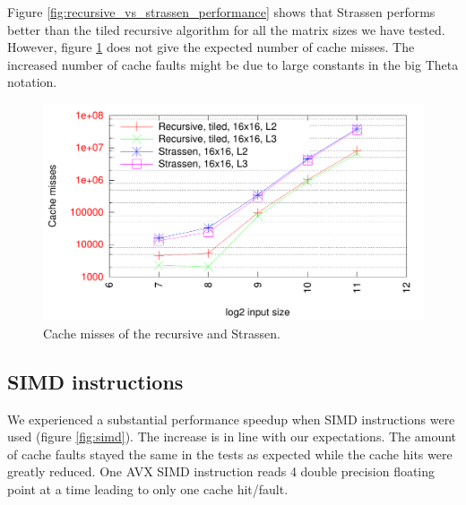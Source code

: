 Figure \ref{fig:recursive_vs_strassen_performance} shows that Strassen performs better than the tiled recursive algorithm for all the matrix sizes we have tested. However, figure \ref{fig:recursive_vs_strassen_cache} does not give the expected number of cache misses. The increased number of cache faults might be due to large constants in the big Theta notation.

\begin{figure}[h!]
  \centering
  \includegraphics[width=\textwidth]{"../project2/gnuplots/recursive_vs_strassen_cache"}
  \caption{Cache misses of the recursive and Strassen.}
  \label{fig:recursive_vs_strassen_cache}
\end{figure}





\subsection{SIMD instructions}

We experienced a substantial performance speedup when SIMD instructions were used (figure \ref{fig:simd}). The increase is in line with our expectations. The amount of cache faults stayed the same in the tests as expected while the cache hits were greatly reduced. One AVX SIMD instruction reads 4 double precision floating point at a time leading to only one cache hit/fault.

